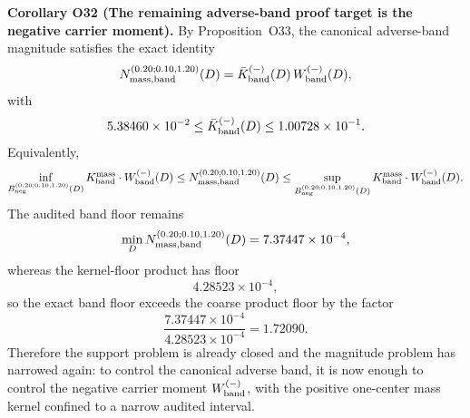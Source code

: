 \documentclass[aps,prd,onecolumn,notitlepage,nofootinbib,superscriptaddress,11pt,floatfix]{revtex4-2}
\begin{document}
\medskip\noindent\textbf{Corollary O32 (The remaining adverse-band proof target is the negative carrier moment).}
By Proposition~O33, the canonical adverse-band magnitude satisfies the exact identity
\[
N_{\rm mass,band}^{(0.20;0.10,1.20)}(D)
=
\bar K_{\rm band}^{(-)}(D)\,W_{\rm band}^{(-)}(D),
\]
with
\[
5.38460\times10^{-2}
\le
\bar K_{\rm band}^{(-)}(D)
\le
1.00728\times10^{-1}.
\]
Equivalently,
\[
\inf_{B_{\rm neg}^{(0.20;0.10,1.20)}(D)}K_{\rm band}^{\rm mass}\cdot W_{\rm band}^{(-)}(D)
\le
N_{\rm mass,band}^{(0.20;0.10,1.20)}(D)
\le
\sup_{B_{\rm neg}^{(0.20;0.10,1.20)}(D)}K_{\rm band}^{\rm mass}\cdot W_{\rm band}^{(-)}(D).
\]
The audited band floor remains
\[
\min_D N_{\rm mass,band}^{(0.20;0.10,1.20)}(D)
=
7.37447\times10^{-4},
\]
whereas the kernel-floor product has floor
\[
4.28523\times10^{-4},
\]
so the exact band floor exceeds the coarse product floor by the factor
\[
\frac{7.37447\times10^{-4}}{4.28523\times10^{-4}}
=
1.72090.
\]
Therefore the support problem is already closed and the magnitude problem has narrowed again: to control the canonical adverse band, it is now enough to control the negative carrier moment \(W_{\rm band}^{(-)}\), with the positive one-center mass kernel confined to a narrow audited interval.
\end{document}
